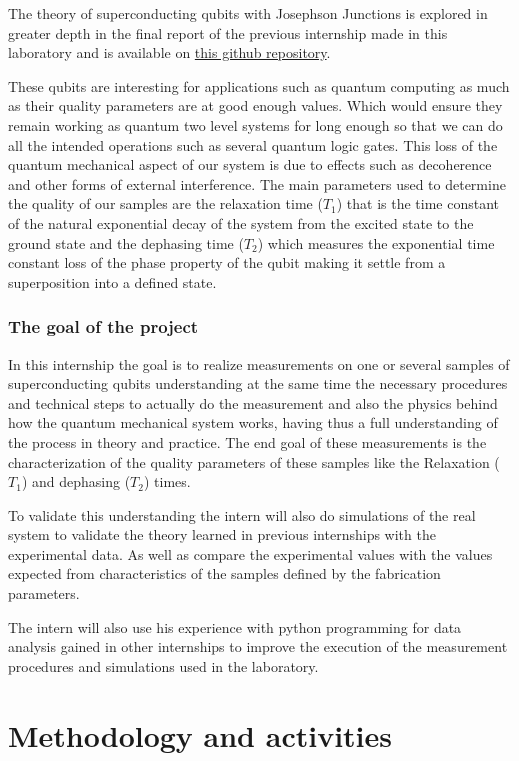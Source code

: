 \documentclass[11pt,onecolumm,a4paper]{article}
\begin{document}
The theory of superconducting qubits with Josephson Junctions is explored in greater depth in the final report of the previous internship made in this laboratory and is available on \hyperlink{https://github.com/Danielgb23/ic-superconductor-qubit}{this github repository}.


These qubits are interesting for applications such as quantum computing as much as their quality parameters are at good enough values. Which would ensure they remain working as quantum two level systems for long enough so that we can do all the intended operations such as several quantum logic gates. This loss of the quantum mechanical aspect of our system is due to effects such as decoherence and other forms of external interference. The main parameters used to determine the quality of our samples are the relaxation time ($T_1$) that is the time constant of the natural exponential decay of the system from the excited state to the ground state and the dephasing time ($T_2$) which measures the exponential time constant loss of the phase property of the qubit making it settle from a superposition into a defined state. 



\section{The goal of the project}
In this internship the goal is to realize measurements on one or several samples of superconducting qubits understanding at the same time the necessary procedures and technical steps to actually do the measurement and also the physics behind how the quantum mechanical system works, having thus a full understanding of the process in theory and practice. The end goal of these measurements is the characterization of the quality parameters of these samples like the Relaxation ($T_1$) and dephasing ($T_2$) times.

To validate this understanding the intern will also do simulations of the real system to validate the theory learned in previous internships with the experimental data. As well as compare the experimental values with the values expected from characteristics of the samples defined by the fabrication parameters.

The intern will also use his experience with python programming for data analysis gained in other internships to improve the execution of the measurement procedures and simulations used in the laboratory.

\part*{Methodology and activities}
\end{document}
